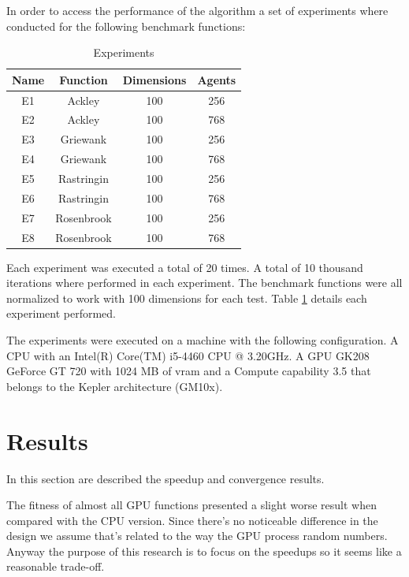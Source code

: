 \documentclass[conference]{IEEEtran}
\begin{document}
In order to access the performance of the algorithm a set of experiments where
conducted for the following benchmark functions:

\begin{table}[H]
    \renewcommand{\arraystretch}{1.3}
    \caption{Experiments}
    \label{list-of-experiments}
    \centering
    \begin{tabular}{c|c|c|c}
    \hline
        \bf Name & Function &  Dimensions & Agents\\
    \hline
        E1 & Ackley & 100 & 256\\
        E2 & Ackley & 100 & 768\\
        E3 & Griewank & 100 & 256\\
        E4 & Griewank & 100 & 768\\
        E5 & Rastringin & 100 & 256\\
        E6 & Rastringin & 100 & 768\\
        E7 & Rosenbrook & 100 & 256\\
        E8 & Rosenbrook & 100 & 768\\
    \end{tabular}
\end{table}

Each experiment was executed a total of 20 times. A total of 10 thousand
iterations where performed in each experiment. The benchmark functions were 
all normalized to work with 100 dimensions for each test. Table \ref{list-of-experiments} 
details each experiment performed.

The experiments were executed on a machine with the following
configuration. A CPU with an Intel(R) Core(TM) i5-4460 CPU @ 3.20GHz. A
GPU GK208 GeForce GT 720 with 1024 MB of vram and a Compute capability
3.5 that belongs to the Kepler architecture (GM10x).



\section{Results} \label{results}%

In this section are described the speedup and convergence results.

The fitness of almost all GPU functions presented a slight worse
result when compared with the CPU version. Since there's no noticeable
difference in the design we assume that's related to the way the GPU
process random numbers. Anyway the purpose of this research is to focus
on the speedups so it seems like a reasonable trade-off.
\end{document}
